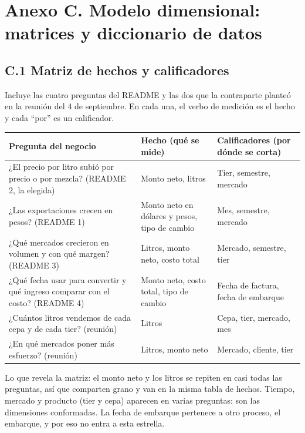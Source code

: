 
\section*{Anexo C. Modelo dimensional: matrices y diccionario de datos}

\subsection*{C.1 Matriz de hechos y calificadores}

Incluye las cuatro preguntas del README y las dos que la contraparte planteó en la reunión del 4 de septiembre. En cada una, el verbo de medición es el hecho y cada ``por'' es un calificador.

\begin{center}
\small
\begin{tabular}{@{}>{\raggedright\arraybackslash}p{}>{\raggedright\arraybackslash}p{}>{\raggedright\arraybackslash}p{}@{}}
\toprule
Pregunta del negocio & Hecho (qué se mide) & Calificadores (por dónde se corta) \\
\midrule
¿El precio por litro subió por precio o por mezcla? (README 2, la elegida) & Monto neto, litros & Tier, semestre, mercado \\
¿Las exportaciones crecen en pesos? (README 1) & Monto neto en dólares y pesos, tipo de cambio & Mes, semestre, mercado \\
¿Qué mercados crecieron en volumen y con qué margen? (README 3) & Litros, monto neto, costo total & Mercado, semestre, tier \\
¿Qué fecha usar para convertir y qué ingreso comparar con el costo? (README 4) & Monto neto, costo total, tipo de cambio & Fecha de factura, fecha de embarque \\
¿Cuántos litros vendemos de cada cepa y de cada tier? (reunión) & Litros & Cepa, tier, mercado, mes \\
¿En qué mercados poner más esfuerzo? (reunión) & Litros, monto neto & Mercado, cliente, tier \\
\bottomrule
\end{tabular}
\end{center}

Lo que revela la matriz: el monto neto y los litros se repiten en casi todas las preguntas, así que comparten grano y van en la misma tabla de hechos. Tiempo, mercado y producto (tier y cepa) aparecen en varias preguntas: son las dimensiones conformadas. La fecha de embarque pertenece a otro proceso, el embarque, y por eso no entra a esta estrella.


